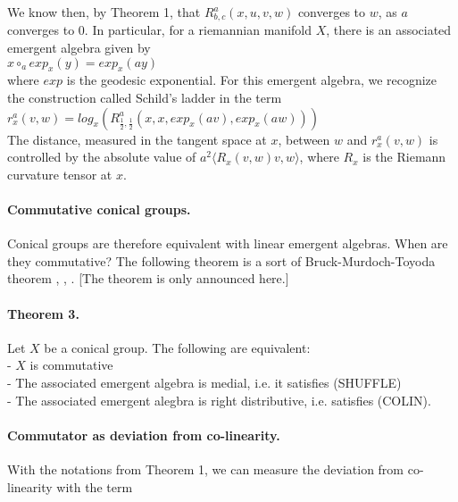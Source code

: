 \documentclass{article}
\begin{document}
We know then, by Theorem 1, that $\displaystyle R^{a}_{b,c}(x,u,v,w)$ converges to $w$, as $a$ converges to $0$. In particular, for a riemannian manifold $X$, there is an associated emergent algebra given by \\

$ x \circ_{a} exp_{x}(y) = exp_{x}(ay)$ \\

\noindent where $exp$ is the geodesic exponential. For this emergent algebra, we recognize the construction called Schild's ladder in the term  \\ 

$\displaystyle r^{a}_{x}(v,w) = log_{x} \left( R^{a}_{\frac{1}{2}, \frac{1}{2}}(x,x, exp_{x}(av), exp_{x}(aw)) \right)$ \\ 

The distance, measured in the tangent space at $x$, between $w$ and $\displaystyle r^{a}_{x}(v,w)$ is controlled by the absolute value of $\displaystyle a^{2} \langle R_{x}(v,w)v,w\rangle$, where $\displaystyle R_{x}$ is the Riemann curvature tensor at $x$. 

\paragraph{Commutative conical groups.} Conical groups are therefore equivalent with linear emergent algebras. When are they commutative? The following theorem is a sort of Bruck-Murdoch-Toyoda theorem \cite{toyoda}, \cite{murdoch}, \cite{bruck}. [The theorem is only announced here.]

\paragraph{Theorem 3.} Let $X$ be a conical group. The following are equivalent: \\

- $X$ is commutative \\

- The associated emergent algebra is medial, i.e. it satisfies (SHUFFLE) \\ 

- The associated emergent alegbra is right distributive, i.e. satisfies (COLIN). \\  




\paragraph{Commutator as deviation from co-linearity.} With the notations from Theorem 1, we can measure the deviation from co-linearity with the term \\
\end{document}
